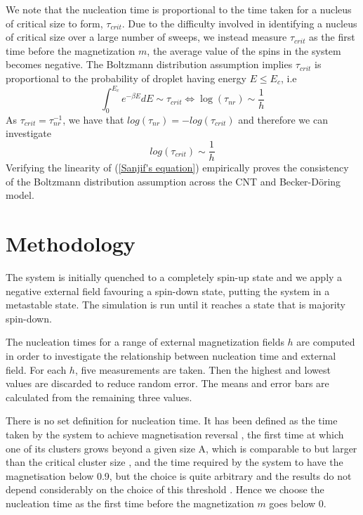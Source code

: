 \documentclass{article}
\begin{document}
\begin{multicols*}{2}
We note that the nucleation time is proportional to the time taken for a nucleus of critical size to form, $\tau_{crit}$. Due to the difficulty involved in identifying a nucleus of critical size over a large number of sweeps, we instead measure $\tau_{crit}$ as the first time before the magnetization $m$, the average value of the spins in the system becomes negative. The Boltzmann distribution assumption implies  $\tau_{crit}$ is proportional to the probability of droplet having energy $E \leq E_{c}$, i.e
\begin{equation}\label{Sanjif's equation}
\int_{0}^{E_{c}} e^{-\beta E} dE \sim \tau_{crit} \Leftrightarrow \log(\tau_{nr}) \sim \frac{1}{h}
\end{equation}
As $\tau_{crit} =\tau_{nr}^{-1}$, we have that $log(\tau_{nr}) = -log(\tau_{crit})$ and therefore we can investigate
\begin{equation}\label{log time-mag relation}
log(\tau_{crit}) \sim \frac{1}{h}
\end{equation}
Verifying the linearity of (\ref{Sanjif's equation}) empirically proves the consistency of the Boltzmann distribution assumption across the CNT and Becker-Döring model.

\maketitle
\section{Methodology}

The system is initially quenched to a completely spin-up state and we apply a negative external field favouring a spin-down state, putting the system in a metastable state. The simulation is run until it reaches a state that is majority spin-down.

The nucleation times for a range of external magnetization fields $h$ are computed in order to investigate the relationship between nucleation time and external field. For each $h$, five measurements are taken. Then the highest and lowest values are discarded to reduce random error. The means and error bars are calculated from the remaining three values.

There is no set definition for nucleation time. It has been defined as the time taken by the system to achieve magnetisation reversal \cite{naskar_fields}, the first time at which one of its clusters grows beyond a given size A, which is comparable to but larger than the critical cluster size \cite{brendel}, and the time required by the system to have the magnetisation below 0.9, but the choice is quite arbitrary and the results do not depend considerably on the choice of this threshold \cite{acharyya}. Hence we choose the nucleation time as the first time before the magnetization $m$ goes below 0.


\end{multicols*}
\end{document}

